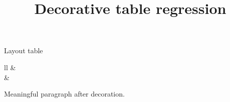 \documentclass[14pt,t]{beamer-accessibility}
\title{Decorative table regression}
\begin{document}
\begin{frame}{Layout table}
\begin{accessibleTable}[decorative=true]
\begin{accessibletabular}{ll}
 &  \tablerowend \\
 &  \tablerowend \\
\end{accessibletabular}
\end{accessibleTable}
Meaningful paragraph after decoration.
\end{frame}
\end{document}
